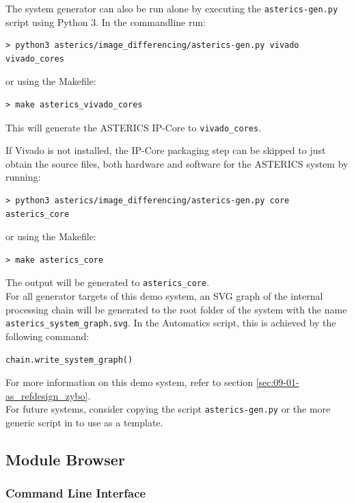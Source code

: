 The system generator can also be run alone by executing the \texttt{asterics-gen.py} script using Python 3.
In the commandline run:
\begin{lstlisting}[style=shell]
 > python3 asterics/image_differencing/asterics-gen.py vivado vivado_cores
\end{lstlisting}
or using the Makefile:
\begin{lstlisting}[style=shell]
 > make asterics_vivado_cores
\end{lstlisting}
This will generate the ASTERICS IP-Core to \texttt{vivado\_cores}.

If Vivado is not installed, the IP-Core packaging step can be skipped to just obtain the source files, both hardware and software for the ASTERICS system by running:
\begin{lstlisting}[style=shell]
 > python3 asterics/image_differencing/asterics-gen.py core asterics_core
\end{lstlisting}
or using the Makefile:
\begin{lstlisting}[style=shell]
 > make asterics_core
\end{lstlisting}
The output will be generated to \texttt{asterics\_core}.\\
For all generator targets of this demo system, an SVG graph of the internal processing chain will be generated to the root folder of the system with the name \texttt{asterics\_system\_graph.svg}.
In the Automatics script, this is achieved by the following command:
\begin{lstlisting}[style=AutomaticsPython]
chain.write_system_graph()
\end{lstlisting}

For more information on this demo system, refer to section \ref{sec:09-01-as_refdesign_zybo}.\\

For future systems, consider copying the script \texttt{asterics-gen.py} or the more generic script in   to use as a template.


\subsection{\asterics Module Browser}
\label{sec:06-02-interactive}

\subsubsection{Command Line Interface}

